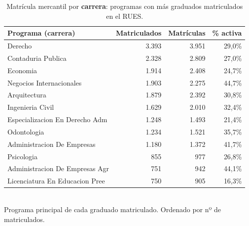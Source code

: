 \begin{table}[H]\centering\footnotesize
\caption{Matrícula mercantil por \textbf{carrera}: programas con más graduados matriculados en el RUES.}\label{tab:rues_carrera}
\begin{tabular}{lrrr}
\toprule
\rowcolor{ustaazul}\textbf{\color{white}Programa (carrera)} & \textbf{\color{white}Matriculados} & \textbf{\color{white}Matrículas} & \textbf{\color{white}\% activa} \\
\midrule
Derecho & 3.393 & 3.951 & 29,0\% \\
Contaduria Publica & 2.328 & 2.809 & 27,0\% \\
Economia & 1.914 & 2.408 & 24,7\% \\
Negocios Internacionales & 1.903 & 2.275 & 44,7\% \\
Arquitectura & 1.879 & 2.392 & 30,8\% \\
Ingenieria Civil & 1.629 & 2.010 & 32,4\% \\
Especializacion En Derecho Adm & 1.248 & 1.493 & 21,4\% \\
Odontologia & 1.234 & 1.521 & 35,7\% \\
Administracion De Empresas & 1.180 & 1.372 & 41,7\% \\
Psicologia & 855 & 977 & 26,8\% \\
Administracion De Empresas Agr & 751 & 942 & 44,1\% \\
Licenciatura En Educacion Pree & 750 & 905 & 16,3\% \\
\bottomrule
\end{tabular}
\\[2pt]{\scriptsize\color{ustagris} Programa principal de cada graduado matriculado. Ordenado por nº de matriculados.}
\end{table}